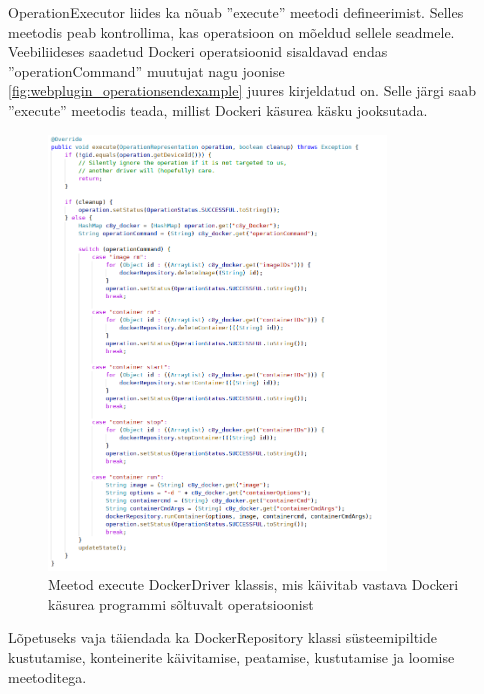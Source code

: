 \documentclass[12pt]{article}
\begin{document}
 \FloatBarrier
 
 OperationExecutor liides ka nõuab ''execute'' meetodi defineerimist. Selles meetodis peab
 kontrollima, kas operatsioon on mõeldud sellele seadmele. Veebiliideses saadetud
 Dockeri operatsioonid sisaldavad endas ''operationCommand'' muutujat nagu joonise
 \ref{fig:webplugin_operationsendexample} juures kirjeldatud on. Selle järgi saab ''execute''
 meetodis teada, millist Dockeri käsurea käsku jooksutada. 

 \begin{figure} [ht] %
 \begin{center}
 \includegraphics[width=0.8\textwidth]{dockerdriver_execute}
 \caption{Meetod execute DockerDriver klassis, mis käivitab vastava Dockeri käsurea programmi sõltuvalt operatsioonist}
 \label{fig:dockerdriver_execute}
 \end{center}
 \end{figure}

 \FloatBarrier

 Lõpetuseks vaja täiendada ka DockerRepository klassi süsteemipiltide kustutamise,
 konteinerite käivitamise, peatamise, kustutamise ja loomise meetoditega.
\end{document}
